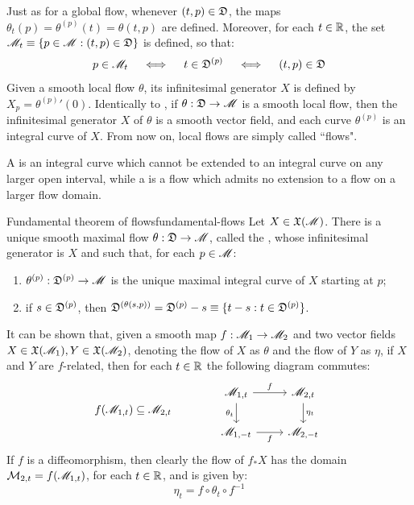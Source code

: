 Just as for a global flow, whenever $ (t,p) \in \mathfrak{D} $, the maps $ \theta_t(p) = \theta^{(p)}(t) = \theta(t,p) $ are defined. Moreover, for each $ t \in \mathbb{R} $, the set $ \mathscr{M}_t \equiv \{p \in \mathscr{M} : (t,p) \in \mathfrak{D}\} $ is defined, so that:
\begin{equation*}
  p \in \mathscr{M}_t
  \quad \iff \quad
  t \in \mathfrak{D}^{(p)}
  \quad \iff \quad
  (t,p) \in \mathfrak{D}
\end{equation*}
Given a smooth local flow $ \theta $, its infinitesimal generator $ X $ is defined by $ X_p = {\theta^{(p)}}'(0) $. Identically to , if $ \theta : \mathfrak{D} \rightarrow \mathscr{M} $ is a smooth local flow, then the infinitesimal generator $ X $ of $ \theta $ is a smooth vector field, and each curve $ \theta^{(p)} $ is an integral curve of $ X $. From now on, local flows are simply called ``flows".

A  is an integral curve which cannot be extended to an integral curve on any larger open interval, while a  is a flow which admits no extension to a flow on a larger flow domain.

\begin{theorem}{Fundamental theorem of flows}{fundamental-flows}
  Let $ X \in \mathfrak{X}(\mathscr{M}) $. There is a unique smooth maximal flow $ \theta : \mathfrak{D} \rightarrow \mathscr{M} $, called the , whose infinitesimal generator is $ X $ and such that, for each $ p \in \mathscr{M} $:
  \begin{enumerate}
    \item \label{item:ftf-1} $ \theta^{(p)} : \mathfrak{D}^{(p)} \rightarrow \mathscr{M} $ is the unique maximal integral curve of $ X $ starting at $ p $;
    \item \label{item:ftf-2} if $ s \in \mathfrak{D}^{(p)} $, then $ \mathfrak{D}^{(\theta(s,p))} = \mathfrak{D}^{(p)} - s \equiv \{t-s : t \in \mathfrak{D}^{(p)}\} $.
  \end{enumerate}
\end{theorem}

It can be shown that, given a smooth map $ f : \mathscr{M}_1 \rightarrow \mathscr{M}_2 $ and two vector fields $ X \in \mathfrak{X}(\mathscr{M}_1) , Y \in \mathfrak{X}(\mathscr{M}_2) $, denoting the flow of $ X $ as $ \theta $ and the flow of $ Y $ as $ \eta $, if $ X $ and $ Y $ are $ f $-related, then for each $ t \in \mathbb{R} $ the following diagram commutes:
\begin{equation}
  f(\man_{1,t}) \ssq \man_{2,t}
  \qquad \qquad
  \begin{tikzcd}
    \man_{1,t} \ar[r , "f"] \ar[d , "\theta_t" , swap] & \man_{2,t} \ar[d , "\eta_t"] \\
    \man_{1,-t} \ar[r , "f" , swap] & \man_{2,-t}
  \end{tikzcd}
\end{equation}
If $ f $ is a diffeomorphism, then clearly the flow of $ f_* X $ has the domain $ \mathcal{M}_{2,t} = f(\mathscr{M}_{1,t}) $, for each $ t \in \mathbb{R} $, and is given by:
\begin{equation}
  \eta_t = f \circ \theta_t \circ f^{-1}
\end{equation}

